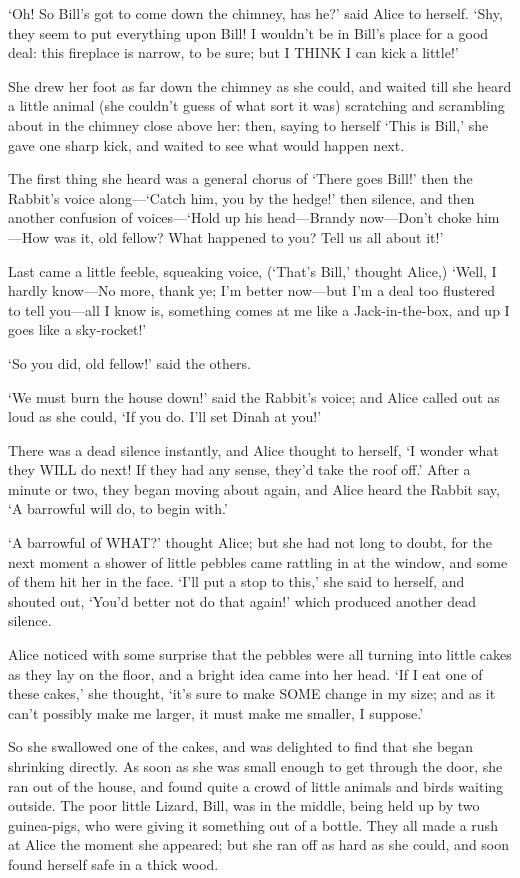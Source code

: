 \documentclass[12pt]{book}
\begin{document}
\begin{Parallel}[p]{}{}
{‘Oh! So Bill’s got to come down the chimney, has he?’ said Alice to herself. ‘Shy, they seem to put everything upon Bill! I wouldn’t be in Bill’s place for a good deal: this fireplace is narrow, to be sure; but I THINK I can kick a little!’

She drew her foot as far down the chimney as she could, and waited till she heard a little animal (she couldn’t guess of what sort it was) scratching and scrambling about in the chimney close above her: then, saying to herself ‘This is Bill,’ she gave one sharp kick, and waited to see what would happen next.

The first thing she heard was a general chorus of ‘There goes Bill!’ then the Rabbit’s voice along—‘Catch him, you by the hedge!’ then silence, and then another confusion of voices—‘Hold up his head—Brandy now—Don’t choke him—How was it, old fellow? What happened to you? Tell us all about it!’

Last came a little feeble, squeaking voice, (‘That’s Bill,’ thought Alice,) ‘Well, I hardly know—No more, thank ye; I’m better now—but I’m a deal too flustered to tell you—all I know is, something comes at me like a Jack-in-the-box, and up I goes like a sky-rocket!’

‘So you did, old fellow!’ said the others.

‘We must burn the house down!’ said the Rabbit’s voice; and Alice called out as loud as she could, ‘If you do. I’ll set Dinah at you!’

There was a dead silence instantly, and Alice thought to herself, ‘I wonder what they WILL do next! If they had any sense, they’d take the roof off.’ After a minute or two, they began moving about again, and Alice heard the Rabbit say, ‘A barrowful will do, to begin with.’

‘A barrowful of WHAT?’ thought Alice; but she had not long to doubt, for the next moment a shower of little pebbles came rattling in at the window, and some of them hit her in the face. ‘I’ll put a stop to this,’ she said to herself, and shouted out, ‘You’d better not do that again!’ which produced another dead silence.

Alice noticed with some surprise that the pebbles were all turning into little cakes as they lay on the floor, and a bright idea came into her head. ‘If I eat one of these cakes,’ she thought, ‘it’s sure to make SOME change in my size; and as it can’t possibly make me larger, it must make me smaller, I suppose.’

So she swallowed one of the cakes, and was delighted to find that she began shrinking directly. As soon as she was small enough to get through the door, she ran out of the house, and found quite a crowd of little animals and birds waiting outside. The poor little Lizard, Bill, was in the middle, being held up by two guinea-pigs, who were giving it something out of a bottle. They all made a rush at Alice the moment she appeared; but she ran off as hard as she could, and soon found herself safe in a thick wood.

}
\end{Parallel}
\end{document}
